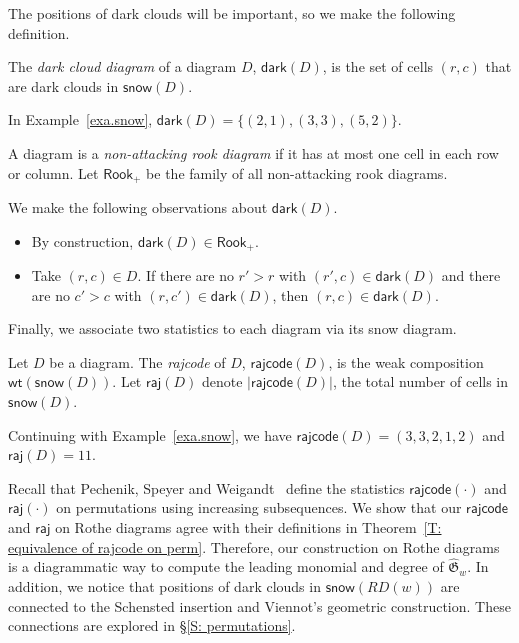 \documentclass[ALCO]{cedram}
\newcommand{\fG}{\mathfrak{G}}
\newcommand{\topGro}{\widehat{\fG}}
\newcommand{\wt}{\mathsf{wt}}
\newcommand{\dark}{\mathsf{dark}}
\newcommand{\snow}{\mathsf{snow}}
\newcommand{\rajcode}{\mathsf{rajcode}}
\newcommand{\raj}{\mathsf{raj}}
\newcommand{\Rook}{\mathsf{Rook}}
\newcommand{\definition}[1]{{\color{darkred}\emph{#1}}}
\begin{document}
The positions of dark clouds will be important,
so we make the following definition.

\begin{defn}
The \definition{dark cloud diagram} of a diagram $D$,
$\dark(D)$, 
is the set of cells $(r,c)$ that are dark clouds in $\snow(D)$.
\end{defn}

\begin{exa}
In Example~\ref{exa.snow},
$\dark(D) = \{(2,1), (3,3), (5,2) \}$.
\end{exa}

A diagram is a 
\definition{non-attacking rook diagram}
if it has at most one cell in each row or column.
Let $\Rook_+$ be the family
of all non-attacking rook diagrams.  


\begin{rem}
\label{R: Basic of dark}
We make the following observations about $\dark(D)$.
\begin{itemize}
\item By construction, $\dark(D) \in \Rook_+$.
\item Take $(r,c) \in D$.
If there are no $r' > r$ with $(r', c) \in \dark(D)$ 
and there are no $c' > c$ with $(r, c') \in \dark(D)$,
then $(r,c) \in \dark(D)$.
\end{itemize}
\end{rem}

Finally, we associate two statistics
to each diagram via its snow diagram.

\begin{defn}\label{defn.raj}
Let $D$ be a diagram.
The \definition{rajcode} of $D$,
$\rajcode(D)$, 
is the weak composition $\wt(\snow(D))$.
Let $\raj(D)$ denote $|\rajcode(D)|$,
the total number of cells in $\snow(D)$.
\end{defn}

\begin{exa}
Continuing with Example~\ref{exa.snow}, we have $\rajcode(D) = (3,3,2,1,2)$ and $\raj(D) = 11$.
\end{exa}

\begin{rem}
Recall that Pechenik, Speyer and Weigandt~\cite{PSW} 
define the statistics $\rajcode(\cdot)$ and $\raj(\cdot)$ on permutations
using increasing subsequences. 
We show that our $\rajcode$ and $\raj$ on Rothe diagrams 
agree with their definitions in Theorem~\ref{T: equivalence of rajcode on perm}.
Therefore, our construction on Rothe diagrams is a diagrammatic way
to compute the leading monomial and degree of $\topGro_w$.
In addition, we notice that positions of dark clouds in $\snow(RD(w))$
are connected to the Schensted insertion and Viennot's geometric construction.
These connections are explored in \S\ref{S: permutations}.
\end{rem}
\end{document}
